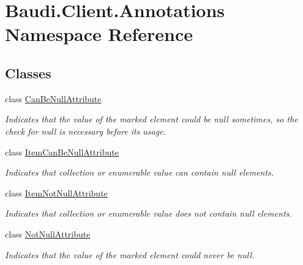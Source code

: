 \hypertarget{namespace_baudi_1_1_client_1_1_annotations}{}\section{Baudi.\+Client.\+Annotations Namespace Reference}
\label{namespace_baudi_1_1_client_1_1_annotations}
\subsection*{Classes}
\begin{DoxyCompactItemize}
\item 
class \hyperlink{class_baudi_1_1_client_1_1_annotations_1_1_can_be_null_attribute}{Can\+Be\+Null\+Attribute}
\begin{DoxyCompactList}\small\item\em Indicates that the value of the marked element could be {\ttfamily null} sometimes, so the check for {\ttfamily null} is necessary before its usage. \end{DoxyCompactList}\item 
class \hyperlink{class_baudi_1_1_client_1_1_annotations_1_1_item_can_be_null_attribute}{Item\+Can\+Be\+Null\+Attribute}
\begin{DoxyCompactList}\small\item\em Indicates that collection or enumerable value can contain null elements. \end{DoxyCompactList}\item 
class \hyperlink{class_baudi_1_1_client_1_1_annotations_1_1_item_not_null_attribute}{Item\+Not\+Null\+Attribute}
\begin{DoxyCompactList}\small\item\em Indicates that collection or enumerable value does not contain null elements. \end{DoxyCompactList}\item 
class \hyperlink{class_baudi_1_1_client_1_1_annotations_1_1_not_null_attribute}{Not\+Null\+Attribute}
\begin{DoxyCompactList}\small\item\em Indicates that the value of the marked element could never be {\ttfamily null}. \end{DoxyCompactList}\end{DoxyCompactItemize}
